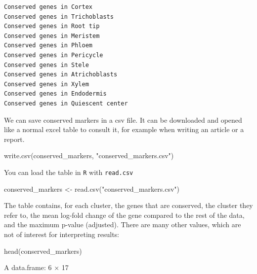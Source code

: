 \documentclass[
  letterpaper,
  DIV=11,
  numbers=noendperiod]{scrartcl}
\newenvironment{Shaded}{}{}
\newcommand{\FunctionTok}[1]{\textcolor[rgb]{0.02,0.16,0.49}{#1}}
\newcommand{\NormalTok}[1]{#1}
\newcommand{\OtherTok}[1]{\textcolor[rgb]{0.00,0.44,0.13}{#1}}
\newcommand{\StringTok}[1]{\textcolor[rgb]{0.25,0.44,0.63}{#1}}
\begin{document}
\begin{verbatim}
Conserved genes in Cortex
Conserved genes in Trichoblasts
Conserved genes in Root tip
Conserved genes in Meristem
Conserved genes in Phloem
Conserved genes in Pericycle
Conserved genes in Stele
Conserved genes in Atrichoblasts
Conserved genes in Xylem
Conserved genes in Endodermis
Conserved genes in Quiescent center
\end{verbatim}

We can save conserved markers in a csv file. It can be downloaded and
opened like a normal excel table to consult it, for example when writing
an article or a report.

\begin{Shaded}
\begin{Highlighting}[]
\FunctionTok{write.csv}\NormalTok{(conserved\_markers, }\StringTok{"conserved\_markers.csv"}\NormalTok{)}
\end{Highlighting}
\end{Shaded}

You can load the table in \texttt{R} with \texttt{read.csv}

\begin{Shaded}
\begin{Highlighting}[]
\NormalTok{conserved\_markers }\OtherTok{\textless{}{-}} \FunctionTok{read.csv}\NormalTok{(}\StringTok{"conserved\_markers.csv"}\NormalTok{)}
\end{Highlighting}
\end{Shaded}

The table contains, for each cluster, the genes that are conserved, the
cluster they refer to, the mean log-fold change of the gene compared to
the rest of the data, and the maximum p-value (adjusted). There are many
other values, which are not of interest for interpreting results:

\begin{Shaded}
\begin{Highlighting}[]
\FunctionTok{head}\NormalTok{(conserved\_markers)}
\end{Highlighting}
\end{Shaded}

A data.frame: 6 × 17
\end{document}
